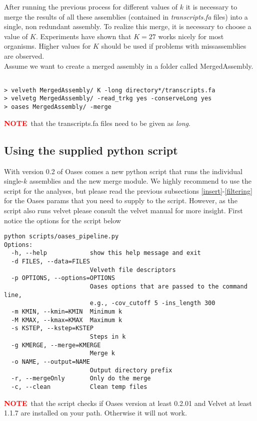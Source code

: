 \documentclass[12pt]{article}
\newcommand{\NOTE}{\textcolor{red}{\textbf{NOTE}}}
\begin{document}
After running the previous process for different values of $k$ it is necessary to merge the results of all these assemblies (contained in \emph{transcripts.fa} files) into a single, non redundant assembly. To realize this merge, it is necessary to choose a value of $K$. Experiments have shown that $K=27$ works nicely for most organisms. Higher values for $K$ should be used if problems with missassemblies are observed. \\
 Assume we want to create a merged assembly in a folder called MergedAssembly.
\begin{verbatim}

> velveth MergedAssembly/ K -long directory*/transcripts.fa
> velvetg MergedAssembly/ -read_trkg yes -conserveLong yes
> oases MergedAssembly/ -merge
\end{verbatim}
\NOTE \ that the transcripts.fa files need to be given as \emph{long}. \\

\subsection{Using the supplied python script}
With version 0.2 of Oases comes a new python script that runs the individual single-$k$ assemblies and the new merge module. We highly recommend to use the script for the analyses, but please read the previous subsections \ref{insert}-\ref{filtering} for the Oases params that you need to supply to the script.  However, as the script also runs velvet please consult the velvet manual for more insight.
First notice the options for the script below \

\begin{verbatim}
python scripts/oases_pipeline.py
Options:
  -h, --help            show this help message and exit
  -d FILES, --data=FILES
                        Velveth file descriptors
  -p OPTIONS, --options=OPTIONS
                        Oases options that are passed to the command line,
                        e.g., -cov_cutoff 5 -ins_length 300
  -m KMIN, --kmin=KMIN  Minimum k
  -M KMAX, --kmax=KMAX  Maximum k
  -s KSTEP, --kstep=KSTEP
                        Steps in k
  -g KMERGE, --merge=KMERGE
                        Merge k
  -o NAME, --output=NAME
                        Output directory prefix
  -r, --mergeOnly       Only do the merge
  -c, --clean           Clean temp files
\end{verbatim}

\NOTE \ that the script checks if Oases version at least 0.2.01 and Velvet at least 1.1.7 are installed on your path. Otherwise it will not work.
 
\end{document}
